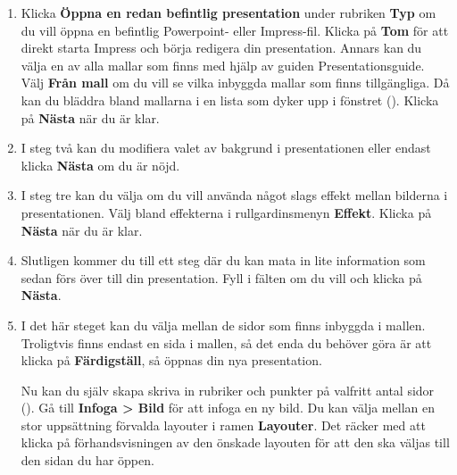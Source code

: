 \documentclass[a4paper,final]{memoir} %
\begin{document}
\begin{enumerate}

\item Klicka \textbf{Öppna en redan befintlig presentation} under rubriken \textbf{Typ} om du vill öppna en befintlig Powerpoint- eller Impress-fil. Klicka på \textbf{Tom} för att direkt starta Impress och börja redigera din presentation. Annars kan du välja en av alla mallar som finns med hjälp av guiden Presentationsguide. Välj \textbf{Från mall} om du vill se vilka inbyggda mallar som finns tillgängliga. Då kan du bläddra bland mallarna i en lista som dyker upp i fönstret (). Klicka på \textbf{Nästa} när du är klar.


\item I steg två kan du modifiera valet av bakgrund i presentationen eller endast klicka \textbf{Nästa} om du är nöjd.

\item I steg tre kan du välja om du vill använda något slags effekt mellan bilderna i presentationen. Välj bland effekterna i rullgardinsmenyn \textbf{Effekt}. Klicka på \textbf{Nästa} när du är klar. 

\item Slutligen kommer du till ett steg där du kan mata in lite information som sedan förs över till din presentation. Fyll i fälten om du vill och klicka på \textbf{Nästa}.

\item I det här steget kan du välja mellan de sidor som finns inbyggda i mallen. Troligtvis finns endast en sida i mallen, så det enda du behöver göra är att klicka på \textbf{Färdigställ}, så öppnas din nya presentation. 


Nu kan du själv skapa skriva in rubriker och punkter på valfritt antal sidor (). Gå till \textbf{Infoga \textgreater{} Bild} för att infoga en ny bild. Du kan välja mellan en stor uppsättning förvalda layouter i ramen \textbf{Layouter}. Det räcker med att klicka på förhandsvisningen av den önskade layouten för att den ska väljas till den sidan du har öppen.

\end{enumerate}

\end{document}
